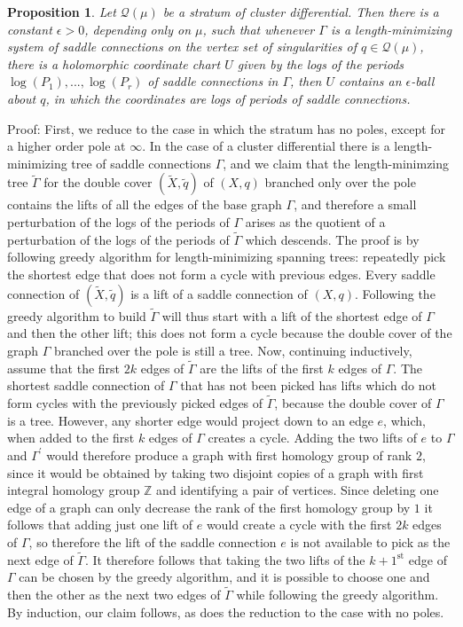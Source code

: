 \documentclass[12pt]{article}
\newtheorem{proposition}[theorem]{Proposition}
\newcommand{\zz}{\mathbb{Z}}
\begin{document}
\begin{proposition}\label{PropMultStablePrep}Let $\mathcal{Q}(\mu)$ be a stratum of cluster differential. Then there is a constant $\epsilon > 0$, depending only on $\mu$, such that whenever $\Gamma$ is a length-minimizing system of saddle connections on the vertex set of singularities of $q \in \mathcal{Q}(\mu)$, there is a holomorphic coordinate chart $U$ given by the logs of the periods $\log(P_1),...,\log(P_r)$ of saddle connections in $\Gamma$, then $U$ contains an $\epsilon$-ball about $q$, in which the coordinates are logs of periods of saddle connections.\end{proposition}

\noindent Proof: First, we reduce to the case in which the stratum has no poles, except for a higher order pole at $\infty$. In the case of a cluster differential there is a length-minimizing tree of saddle connections $\Gamma$, and we claim that the length-minimzing tree $\tilde{\Gamma}$ for the double cover $(\tilde{X},\tilde{q})$ of $(X,q)$ branched only over the pole contains the lifts of all the edges of the base graph $\Gamma$, and therefore a small perturbation of the logs of the periods of $\Gamma$ arises as the quotient of a perturbation of the logs of the periods of $\tilde{\Gamma}$ which descends. The proof is by following greedy algorithm for length-minimizing spanning trees: repeatedly pick the shortest edge that does not form a cycle with previous edges. Every saddle connection of $(\tilde{X},\tilde{q})$ is a lift of a saddle connection of $(X,q)$. Following the greedy algorithm to build $\tilde{\Gamma}$ will thus start with a lift of the shortest edge of $\Gamma$ and then the other lift; this does not form a cycle because the double cover of the graph $\Gamma$ branched over the pole is still a tree. Now, continuing inductively, assume that the first $2k$ edges of $\tilde{\Gamma}$ are the lifts of the first $k$ edges of $\Gamma$. The shortest saddle connection of $\Gamma$ that has not been picked has lifts which do not form cycles with the previously picked edges of $\tilde{\Gamma}$, because the double cover of $\Gamma$ is a tree. However, any shorter edge would project down to an edge $e$, which, when added to the first $k$ edges of $\Gamma$ creates a cycle. Adding the two lifts of $e$ to $\Gamma$ and $\Gamma^\prime$ would therefore produce a graph with first homology group of rank $2$, since it would be obtained by taking two disjoint copies of a graph with first integral homology group $\zz$ and identifying a pair of vertices. Since deleting one edge of a graph can only decrease the rank of the first homology group by $1$ it follows that adding just one lift of $e$ would create a cycle with the first $2k$ edges of $\Gamma$, so therefore the lift of the saddle connection $e$ is not available to pick as the next edge of $\tilde{\Gamma}$. It therefore follows that taking the two lifts of the $k+1^{\mathrm{st}}$ edge of $\Gamma$ can be chosen by the greedy algorithm, and it is possible to choose one and then the other as the next two edges of $\tilde{\Gamma}$ while following the greedy algorithm. By induction, our claim follows, as does the reduction to the case with no poles.\\
\end{document}
